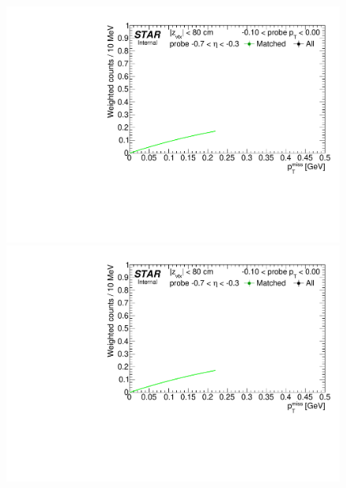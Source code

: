 \begin{figure}[h!]
{  \includegraphics[width=\linewidth,page=9]{graphics/correctionsToEff/TOF_tagAndProbe/Fitting_effVsPt_data_ETABINS_D.CPT2.pdf}\\
  \includegraphics[width=\linewidth,page=11]{graphics/correctionsToEff/TOF_tagAndProbe/Fitting_effVsPt_data_ETABINS_D.CPT2.pdf}

}
\end{figure}
